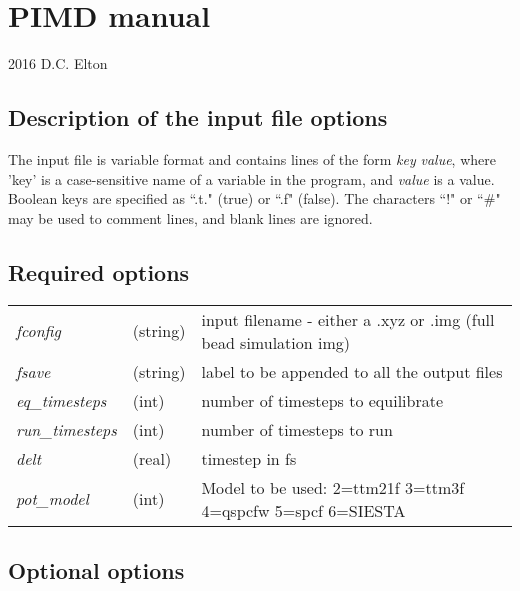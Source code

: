 \documentclass[10pt]{article}
\author{Dan Elton}
\date{\today}
\begin{document}
\section*{PIMD manual}
2016 D.C. Elton \\

\subsection*{Description of the input file options}
The input file is variable format and contains lines of the form {\it key}  {\it value}, where 'key' is a case-sensitive name of a variable in the program, and {\it value} is a value. Boolean keys are specified as ``.t." (true) or ``.f" (false). The characters ``!" or ``\#" may be used to comment lines, and blank lines are ignored. 

\subsection*{Required options}
\begin{tabular}{lll}
\textit{fconfig} &(string)& input filename - either a .xyz or .img (full bead simulation img)\\
\textit{fsave} &(string)& label to be appended to all the output files\\
\textit{eq\_timesteps}& (int)& number of timesteps to equilibrate		 \\
\textit{run\_timesteps}& (int)& number of timesteps to run \\
\textit{delt} &(real)& timestep in fs\\
\textit{pot\_model}&(int)&  Model to be used: 2=ttm21f 3=ttm3f 4=qspcfw 5=spcf 6=SIESTA\\
\end{tabular} 

\subsection*{Optional options}
\end{document}
